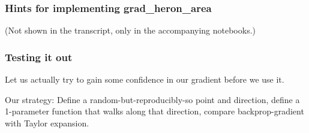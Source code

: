 \documentclass[11pt]{article}
\begin{document}
    \hypertarget{hints-for-implementing-grad_heron_area}{%
\subsubsection{Hints for implementing
grad\_heron\_area}\label{hints-for-implementing-grad_heron_area}}

(Not shown in the transcript, only in the accompanying notebooks.)



    \hypertarget{testing-it-out}{%
\subsubsection{Testing it out}\label{testing-it-out}}

Let us actually try to gain some confidence in our gradient before we
use it.

Our strategy: Define a random-but-reproducibly-so point and direction,
define a 1-parameter function that walks along that direction, compare
backprop-gradient with Taylor expansion.
\end{document}
